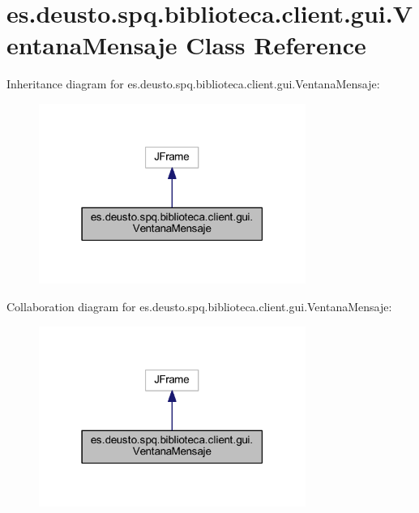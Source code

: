 \hypertarget{classes_1_1deusto_1_1spq_1_1biblioteca_1_1client_1_1gui_1_1_ventana_mensaje}{}\section{es.\+deusto.\+spq.\+biblioteca.\+client.\+gui.\+Ventana\+Mensaje Class Reference}
\label{classes_1_1deusto_1_1spq_1_1biblioteca_1_1client_1_1gui_1_1_ventana_mensaje}


Inheritance diagram for es.\+deusto.\+spq.\+biblioteca.\+client.\+gui.\+Ventana\+Mensaje\+:
\nopagebreak
\begin{figure}[H]
\begin{center}
\leavevmode
\includegraphics[width=247pt]{classes_1_1deusto_1_1spq_1_1biblioteca_1_1client_1_1gui_1_1_ventana_mensaje__inherit__graph}
\end{center}
\end{figure}


Collaboration diagram for es.\+deusto.\+spq.\+biblioteca.\+client.\+gui.\+Ventana\+Mensaje\+:
\nopagebreak
\begin{figure}[H]
\begin{center}
\leavevmode
\includegraphics[width=247pt]{classes_1_1deusto_1_1spq_1_1biblioteca_1_1client_1_1gui_1_1_ventana_mensaje__coll__graph}
\end{center}
\end{figure}
